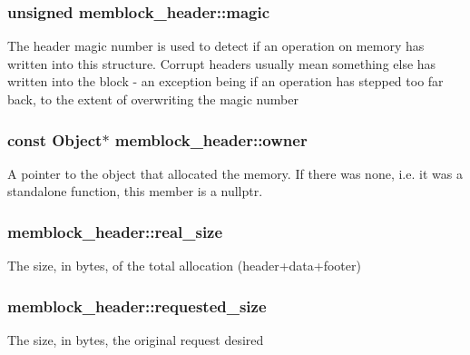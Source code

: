 \subsubsection[{magic}]{\setlength{\rightskip}{0pt plus 5cm}unsigned memblock\-\_\-header\-::magic}\label{structmemblock__header_a10ebc950edccb690a784aceb6362d696}
The header magic number is used to detect if an operation on memory has written into this structure. Corrupt headers usually mean something else has written into the block -\/ an exception being if an operation has stepped too far back, to the extent of overwriting the magic number 
\subsubsection[{owner}]{\setlength{\rightskip}{0pt plus 5cm}const {\bf Object}$\ast$ memblock\-\_\-header\-::owner}\label{structmemblock__header_a4a1f4790e308d4211fee21b6eceeebc4}
A pointer to the object that allocated the memory. If there was none, i.\-e. it was a standalone function, this member is a nullptr. 
\subsubsection[{real\-\_\-size}]{ memblock\-\_\-header\-::real\-\_\-size}\label{structmemblock__header_a07b25257ab31ff95fa23911214371462}
The size, in bytes, of the total allocation (header+data+footer) 
\subsubsection[{requested\-\_\-size}]{ memblock\-\_\-header\-::requested\-\_\-size}\label{structmemblock__header_a46ddeb376649b481b8cb72fe59e90b1d}
The size, in bytes, the original request desired 